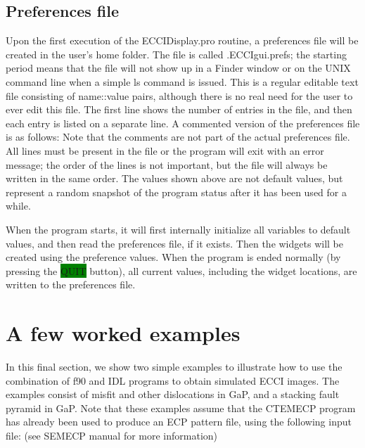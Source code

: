 \documentclass[DIV=calc, paper=letter, fontsize=11pt]{scrartcl}	 %
\newcommand{\button}[1]{\colorbox{green}{\textsf{#1}} button}
\begin{document}
\subsection{Preferences file\label{sec:idlpref}}
Upon the first execution of the \textsf{ECCIDisplay.pro} routine, a preferences file will be created in the user's home folder.  
The file is called \textsf{.ECCIgui.prefs}; the starting period
means that the file will not show up in a Finder window or on the UNIX command line when a simple \textsf{ls} command is issued.  This is a 
regular editable text file consisting of name::value pairs, although there is no real
need for the user to ever edit this file.  The first line shows the number of entries in the file, and then each entry is listed on a 
separate line.  A commented version of the preferences file is as follows:
Note that the comments are not part of the actual preferences file.  All lines must be present in the file or the program will exit with an error message; the order 
of the lines is not important, but the file will always be written in the same order.
The values shown above are not default values, but represent a random snapshot of the program status after it has been used for a while.

When the program starts, it will first internally initialize all variables to default values, and then read the preferences
file, if it exists.  Then the widgets will be created using the preference values.  When the program is ended normally (by
pressing the \button{QUIT}), all current values, including the widget locations, are written to the preferences
file.


\newcommand{\dislo}[6]{$\frac{1}{6}[#1\,#2\,#3]\vert [#4\,#5\,#6]$}
\newcommand{\dislop}[3]{$\frac{1}{2}[#1\,#2\,#3]$}
\newcommand{\bo}{\bar{1}}
\newcommand{\bt}{\bar{2}}

\newpage
\section{A few worked examples\label{sec:examples}}
In this final section, we show two simple examples to illustrate how to use the combination of f90 and IDL programs 
to obtain simulated ECCI images.  The examples consist of misfit and other dislocations in GaP, and a stacking fault pyramid in GaP.
Note that these examples assume that the \textsf{CTEMECP} program has already been used to produce an ECP pattern file, using the 
following input file: (see \textsf{SEMECP} manual for more information)
\end{document}
